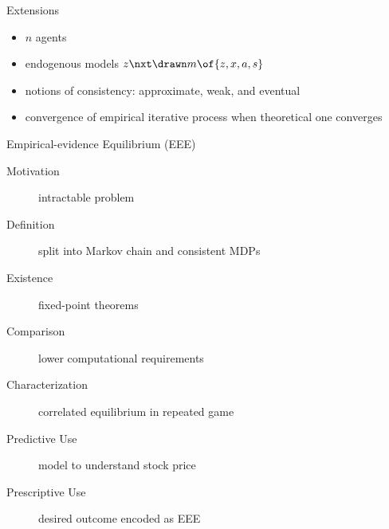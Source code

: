 \begin{frame}{Extensions}
\begin{itemize}
\item \(n\) agents
\item endogenous models \(z\nxt \drawn m \of{z, x, a, s}\)
\item notions of consistency: approximate, weak, and eventual \newinthesis
\item convergence of empirical iterative process when theoretical one converges \newinthesis
\end{itemize}
\end{frame}
\begin{frame}{Empirical-evidence Equilibrium (EEE)}
\begin{description}
\item[Motivation] intractable problem
\item[Definition] split into Markov chain and consistent MDPs
\item[Existence] fixed-point theorems
\item[Comparison] lower computational requirements
\item[Characterization] correlated equilibrium in repeated game
\item[Predictive Use] model to understand stock price
\item[Prescriptive Use] desired outcome encoded as EEE
\end{description}
\end{frame}
